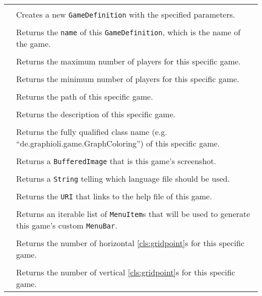 \paragraph*{}
\begin{longtable}{Lp{10cm}}
	\startmethodtable
	 \\
	& Creates a new \texttt{GameDefinition} with the specified parameters. \\
	 \\
	& Returns the \texttt{name} of this \texttt{GameDefinition}, which is the name of the game. \\
	 \\
	& Returns the maximum number of players for this specific game. \\
	 \\
	& Returns the minimum number of players for this specific game. \\
	 \\
	& Returns the path of this specific game. \\
	 \\
	& Returns the description of this specific game. \\
	 \\
	& Returns the fully qualified class name (e.g. ``de.graphioli.game.GraphColoring'') of this specific game. \\
	 \\
	& Returns a \texttt{BufferedImage} that is this game's screenshot. \\
	 \\
	& Returns a \texttt{String} telling which language file should be used. \\
	 \\
	& Returns the \texttt{URI} that links to the help file of this game. \\
	 \\
	& Returns an iterable list of \texttt{MenuItem}s that will be used to generate this game's custom \texttt{MenuBar}. \\
	 \\
	& Returns the number of horizontal \ref{cls:gridpoint}s for this specific game. \\
	 \\
	& Returns the number of vertical \ref{cls:gridpoint}s for this specific game. \\
	\hline
\end{longtable}

